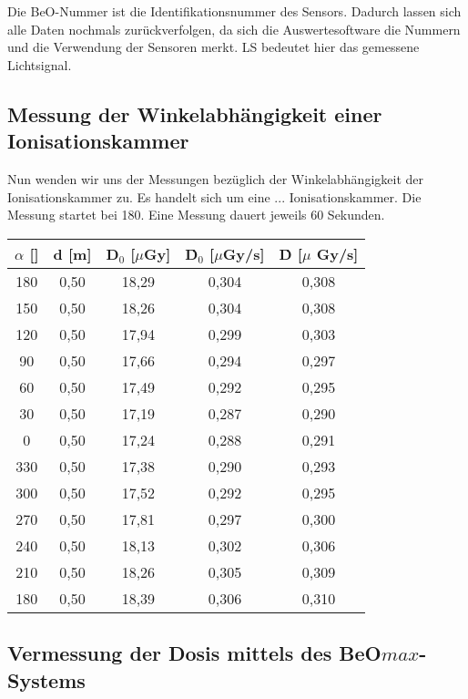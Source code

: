 Die BeO-Nummer ist die Identifikationsnummer des Sensors. Dadurch lassen sich alle Daten nochmals zurückverfolgen, da sich die Auswertesoftware die Nummern und die Verwendung der Sensoren merkt. LS bedeutet hier das gemessene Lichtsignal.
		
\subsection{Messung der Winkelabhängigkeit einer Ionisationskammer}

Nun wenden wir uns der Messungen bezüglich der Winkelabhängigkeit der Ionisationskammer zu. Es handelt sich um eine ... Ionisationskammer. Die Messung startet bei 180\textdegree. Eine Messung dauert jeweils 60 Sekunden.

	\begin{center}
		\begin{tabular}{c|c|c|c|c}
				\textbf{$\alpha$} [\textdegree] & \textbf{d} [m] & \textbf{D$_0$} [$\mu$Gy] & \textbf{\.D$_0$} [$\mu$Gy/s] & \textbf{\.D} [$\mu$ Gy/s] \\ 
		\hline	180 & 0,50 & 18,29 & 0,304 & 0,308 \\ 
				150 & 0,50 & 18,26 & 0,304 & 0,308 \\ 
				120 & 0,50 & 17,94 & 0,299 & 0,303 \\ 
				90  & 0,50 & 17,66 & 0,294 & 0,297 \\ 
				60  & 0,50 & 17,49 & 0,292 & 0,295 \\ 
				30  & 0,50 & 17,19 & 0,287 & 0,290 \\ 
				0   & 0,50 & 17,24 & 0,288 & 0,291 \\ 
				330 & 0,50 & 17,38 & 0,290 & 0,293 \\ 
				300 & 0,50 & 17,52 & 0,292 & 0,295 \\ 
				270 & 0,50 & 17,81 & 0,297 & 0,300 \\ 
				240 & 0,50 & 18,13 & 0,302 & 0,306 \\ 
			    210 & 0,50 & 18,26 & 0,305 & 0,309 \\ 
		\hline	180 & 0,50 & 18,39 & 0,306 & 0,310 \\ 
		\end{tabular} 
	\end{center}
				

\subsection{Vermessung der Dosis mittels des BeO$max$-Systems}

